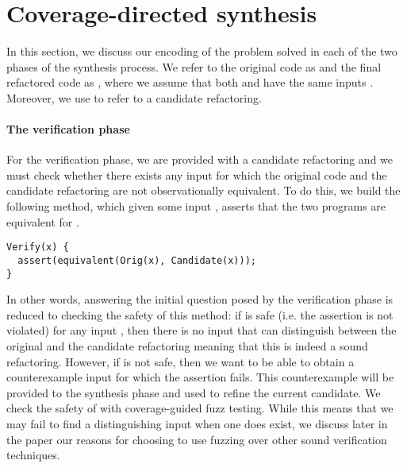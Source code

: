 \documentclass[runningheads,a4paper]{llncs}
\begin{document}



\section{Coverage-directed synthesis}\label{sec:encoding}

In this section, we discuss our encoding of the problem solved in each
of the two phases of the synthesis process.  We refer to the original
code as  and the final refactored code as
, where we assume that both  and
 have the same inputs . Moreover,
we use  to refer to a candidate refactoring.


\paragraph{The verification phase} For the verification phase, we are provided with a candidate
refactoring and we must check whether there exists any input
 for which the original code and the candidate
refactoring are not observationally equivalent.  To do this, we build
the following  method, which given some input
, asserts that the two programs are equivalent for
.

\begin{lstlisting}[mathescape=true,showstringspaces=false]
Verify(x) {
  assert(equivalent(Orig(x), Candidate(x)));
}
\end{lstlisting}

In other words, answering the initial question posed by the verification
phase is reduced to checking the safety of this method: if
 is safe (i.e. the assertion is not violated) for any
input , then there is no input that can distinguish
between the original and the candidate refactoring meaning that this
is indeed a sound refactoring. However, if  is not safe,
then we want to be able to obtain a counterexample input
 for which the assertion fails. This counterexample
will be provided to the synthesis phase and used to refine the current
candidate. We check the safety of  with coverage-guided
fuzz testing. While this means that we may fail to find a
distinguishing input when one does exist, we discuss later in the
paper our reasons for choosing to use fuzzing over other sound
verification techniques.
\end{document}
